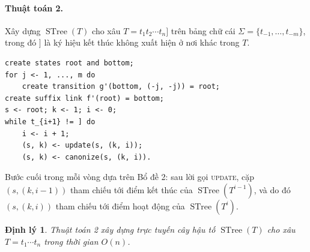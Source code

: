 \documentclass[11pt]{article}
\newtheorem{theorem}{Định lý}
\newcommand{\STree}{\operatorname{STree}}
\begin{document}
\paragraph{Thuật toán 2.}
Xây dựng $\STree(T)$ cho xâu $T=t_1t_2\cdots t_n]$ trên bảng chữ cái
$\Sigma=\{t_{-1},\ldots,t_{-m}\}$, trong đó $]$ là ký hiệu kết thúc không xuất
hiện ở nơi khác trong $T$.
\begin{verbatim}
create states root and bottom;
for j <- 1, ..., m do
    create transition g'(bottom, (-j, -j)) = root;
create suffix link f'(root) = bottom;
s <- root; k <- 1; i <- 0;
while t_{i+1} != ] do
    i <- i + 1;
    (s, k) <- update(s, (k, i));
    (s, k) <- canonize(s, (k, i)).
\end{verbatim}

Bước cuối trong mỗi vòng dựa trên Bổ đề 2: sau lời gọi \textsc{update}, cặp
$(s,(k,i-1))$ tham chiếu tới điểm kết thúc của $\STree(T^{i-1})$, và do đó
$(s,(k,i))$ tham chiếu tới điểm hoạt động của $\STree(T^i)$.

\begin{theorem}
Thuật toán 2 xây dựng trực tuyến cây hậu tố $\STree(T)$ cho xâu
$T=t_1\cdots t_n$ trong thời gian $O(n)$.
\end{theorem}
\end{document}
